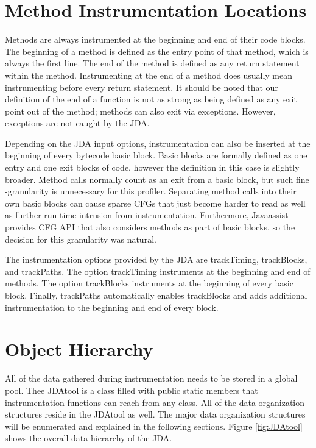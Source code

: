 \documentclass[conference,10pt,twocolumn]{./IEEE/IEEEtran}
\begin{document}
\section{Method Instrumentation Locations}
Methods are always instrumented at the beginning and end of their code blocks.
The beginning of a method is defined as the entry point of that method, which is always the first line.
The end of the method is defined as any return statement within the method.
Instrumenting at the end of a method does usually mean instrumenting before every return statement.
It should be noted that our definition of the end of a function is not as strong as being defined as any exit point out of the method; methods can also exit via exceptions.
However, exceptions are not caught by the JDA.

Depending on the JDA input options, instrumentation can also be inserted at the beginning of every bytecode basic block.
Basic blocks are formally defined as one entry and one exit blocks of code, however the definition in this case is slightly broader.
Method calls normally count as an exit from a basic block, but such fine -granularity is unnecessary for this profiler.
Separating method calls into their own basic blocks can cause sparse CFGs that just become harder to read as well as further run-time intrusion from instrumentation.
Furthermore, Javaassist provides CFG API that also considers methods as part of basic blocks, so the decision for this granularity was natural.

The instrumentation options provided by the JDA are trackTiming, trackBlocks, and trackPaths.
The option trackTiming instruments at the beginning and end of methods.
The option trackBlocks instruments at the beginning of every basic block.
Finally, trackPaths automatically enables trackBlocks and adds additional instrumentation to the beginning and end of every block.  

\section{Object Hierarchy}
All of the data gathered during instrumentation needs to be stored in a global pool.
Thee JDAtool is a class filled with public static members that instrumentation functions can reach from any class.
All of the data organization structures reside in the JDAtool as well.
The major data organization structures will be enumerated and explained in the following sections.
Figure \ref{fig:JDAtool} shows the overall data hierarchy of the JDA.
\end{document}
